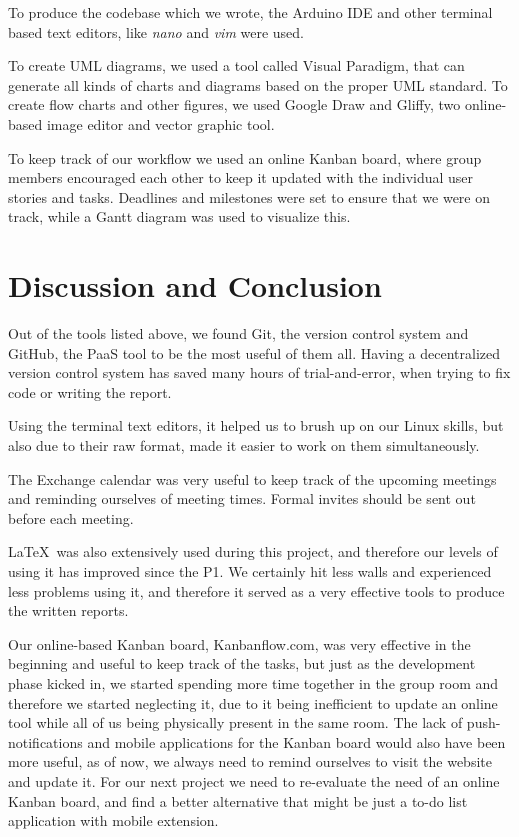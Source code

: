 To produce the codebase which we wrote, the Arduino IDE and other terminal based text editors, like \textit{nano} and \textit{vim} were used.

To create UML diagrams, we used a tool called Visual Paradigm, that can generate all kinds of charts and diagrams based on the proper UML standard. To create flow charts and other figures, we used Google Draw and Gliffy, two online-based image editor and vector graphic tool.

To keep track of our workflow we used an online Kanban board, where group members encouraged each other to keep it updated with the individual user stories and tasks. Deadlines and milestones were set to ensure that we were on track, while a Gantt diagram was used to visualize this.

\section{Discussion and Conclusion}
Out of the tools listed above, we found Git, the version control system and GitHub, the PaaS tool to be the most useful of them all. Having a decentralized version control system has saved many hours of trial-and-error, when trying to fix code or writing the report. 

Using the terminal text editors, it helped us to brush up on our Linux skills, but also due to their raw format, made it easier to work on them simultaneously. 

The Exchange calendar was very useful to keep track of the upcoming meetings and reminding ourselves of meeting times. Formal invites should be sent out before each meeting.

\LaTeX ~was also extensively used during this project, and therefore our levels of using it has improved since the P1. We certainly hit less walls and experienced less problems using it, and therefore it served as a very effective tools to produce the written reports.

Our online-based Kanban board, Kanbanflow.com, was very effective in the beginning and useful to keep track of the tasks, but just as the development phase kicked in, we started spending more time together in the group room and therefore we started neglecting it, due to it being inefficient to update an online tool while all of us being physically present in the same room. The lack of push-notifications and mobile applications for the Kanban board would also have been more useful, as of now, we always need to remind ourselves to visit the website and update it. For our next project we need to re-evaluate the need of an online Kanban board, and find a better alternative that might be just a to-do list application with mobile extension.

